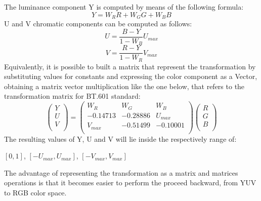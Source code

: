 \documentclass[12pt,a4paper]{extarticle}
\begin{document}
The luminance component Y is computed by means of the following formula:
\[Y = W_{R}R + W_{G}G + W_{B}B\]
U and V chromatic components can be computed as follows:
\[U = \frac{B-Y}{1-W_{B}} U_{max}\]
\[V =\frac{R-Y}{1-W_{R}} V_{max}\]
Equivalently, it is possible to built a matrix that represent the transformation by substituting values for constants and expressing the color component as a Vector, obtaining a matrix vector multiplication like the one below, that refers to the transformation matrix for BT.601 standard:
\[
\begin{pmatrix}
Y\\
U\\
V\\
\end{pmatrix}
=
\begin{pmatrix}
W_{R} & W_{G} & W_{B}\\
-0.14713 & -0.28886 & U_{max}\\
V_{max} & -0.51499 & -0.10001\\
\end{pmatrix}
\begin{pmatrix}
R\\
G\\
B\\
\end{pmatrix}
\]
The resulting values of Y, U and V will lie inside the respectively range of:
\begin{center}
$[0,1]$, $[-U_{max},U_{max}]$, $[-V_{max},V_{max}]$
\end{center}


The advantage of representing the transformation as a matrix and matrices operations is that it becomes easier to perform the proceed backward, from YUV to RGB color space.
\end{document}
